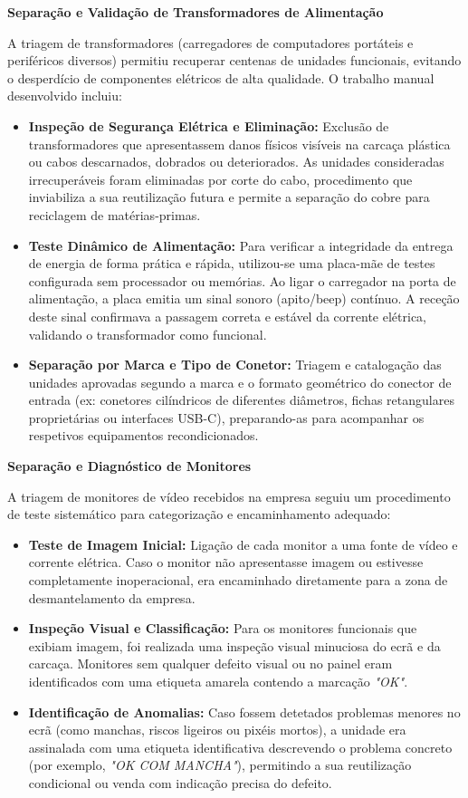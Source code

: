 \noindent\textbf{Separação e Validação de Transformadores de Alimentação}

A triagem de transformadores (carregadores de computadores portáteis e periféricos diversos) permitiu recuperar centenas de unidades funcionais, evitando o desperdício de componentes elétricos de alta qualidade. O trabalho manual desenvolvido incluiu:
\begin{itemize}
    \item \textbf{Inspeção de Segurança Elétrica e Eliminação:} Exclusão de transformadores que apresentassem danos físicos visíveis na carcaça plástica ou cabos descarnados, dobrados ou deteriorados. As unidades consideradas irrecuperáveis foram eliminadas por corte do cabo, procedimento que inviabiliza a sua reutilização futura e permite a separação do cobre para reciclagem de matérias-primas.
    \item \textbf{Teste Dinâmico de Alimentação:} Para verificar a integridade da entrega de energia de forma prática e rápida, utilizou-se uma placa-mãe de testes configurada sem processador ou memórias. Ao ligar o carregador na porta de alimentação, a placa emitia um sinal sonoro (apito/beep) contínuo. A receção deste sinal confirmava a passagem correta e estável da corrente elétrica, validando o transformador como funcional.
    \item \textbf{Separação por Marca e Tipo de Conetor:} Triagem e catalogação das unidades aprovadas segundo a marca e o formato geométrico do conector de entrada (ex: conetores cilíndricos de diferentes diâmetros, fichas retangulares proprietárias ou interfaces USB-C), preparando-as para acompanhar os respetivos equipamentos recondicionados.
\end{itemize}

\noindent\textbf{Separação e Diagnóstico de Monitores}

A triagem de monitores de vídeo recebidos na empresa seguiu um procedimento de teste sistemático para categorização e encaminhamento adequado:
\begin{itemize}
    \item \textbf{Teste de Imagem Inicial:} Ligação de cada monitor a uma fonte de vídeo e corrente elétrica. Caso o monitor não apresentasse imagem ou estivesse completamente inoperacional, era encaminhado diretamente para a zona de desmantelamento da empresa.
    \item \textbf{Inspeção Visual e Classificação:} Para os monitores funcionais que exibiam imagem, foi realizada uma inspeção visual minuciosa do ecrã e da carcaça. Monitores sem qualquer defeito visual ou no painel eram identificados com uma etiqueta amarela contendo a marcação \textit{"OK"}.
    \item \textbf{Identificação de Anomalias:} Caso fossem detetados problemas menores no ecrã (como manchas, riscos ligeiros ou pixéis mortos), a unidade era assinalada com uma etiqueta identificativa descrevendo o problema concreto (por exemplo, \textit{"OK COM MANCHA"}), permitindo a sua reutilização condicional ou venda com indicação precisa do defeito.
\end{itemize}

